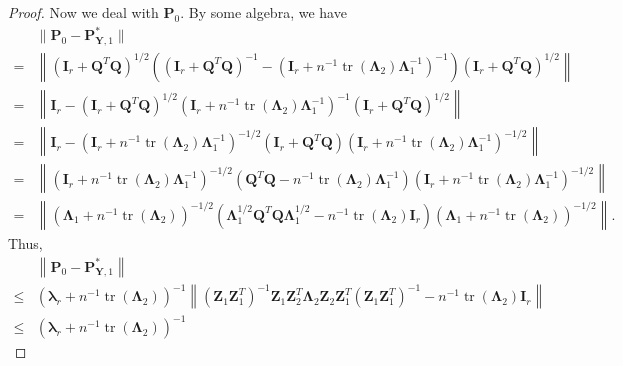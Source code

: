 \documentclass[12pt]{article} %
\DeclareMathOperator{\mytr}{tr}
\newcommand{\bQ}{\mathbf{Q}}
\newcommand{\bZ}{\mathbf{Z}}
\newcommand{\bP}{\mathbf{P}}
\newcommand{\bY}{\mathbf{Y}}
\newcommand{\bI}{\mathbf{I}}
\newcommand{\bfsym}[1]{\ensuremath{\boldsymbol{#1}}}
\def\blambda {\bfsym {\lambda}}
\def\bLambda {\bfsym {\Lambda}}
\theoremstyle{definition}
\begin{document}
\begin{appendices}
\begin{proof}
    Now we deal with $\bP_0$.
    By some algebra, we have
    \begin{equation*}
        \begin{split}
        &\Big\|\bP_0
        -
        \bP_{\bY,1}^*
        \Big\|
        \\
        = &
        \left\|
\left(\bI_r+ \bQ^T \bQ \right)^{1/2}
        \left(
    \left(\bI_r+ \bQ^T \bQ \right)^{-1}
-
    \left(\bI_r+ n^{-1}\mytr(\bLambda_2)\bLambda_1^{-1}\right)^{-1}
\right)
\left(\bI_r+ \bQ^T \bQ \right)^{1/2}
        \right\|
        \\
        = &
        \left\|
        \bI_r-
\left(\bI_r+ \bQ^T \bQ \right)^{1/2}
    \left(\bI_r+ n^{-1}\mytr(\bLambda_2)\bLambda_1^{-1}\right)^{-1}
\left(\bI_r+ \bQ^T \bQ \right)^{1/2}
        \right\|
        \\
        = &
        \left\|
        \bI_r-
    \left(\bI_r+ n^{-1}\mytr(\bLambda_2)\bLambda_1^{-1}\right)^{-1/2}
\left(\bI_r+ \bQ^T \bQ \right)
    \left(\bI_r+ n^{-1}\mytr(\bLambda_2)\bLambda_1^{-1}\right)^{-1/2}
        \right\|
        \\
        = &
        \left\|
    \left(\bI_r+ n^{-1}\mytr(\bLambda_2)\bLambda_1^{-1}\right)^{-1/2}
    \left(\bQ^T \bQ-n^{-1}\mytr(\bLambda_2) \bLambda_1^{-1} \right)
    \left(\bI_r+ n^{-1}\mytr(\bLambda_2)\bLambda_1^{-1}\right)^{-1/2}
        \right\|
        \\
        =&
        \left\|
        \left(\bLambda_1+n^{-1}\mytr(\bLambda_2)\right)^{-1/2}
        \left(
            \bLambda_1^{1/2}\bQ^T \bQ \bLambda_1^{1/2}
            - n^{-1} \mytr(\bLambda_2) \bI_r
        \right)
        \left(\bLambda_1+n^{-1}\mytr(\bLambda_2)\right)^{-1/2}
        \right\|
        .
        \end{split}
    \end{equation*}
    Thus,
    \begin{equation*}
        \begin{split}
        &
        \left\|
        \bP_0-\bP_{\bY,1}^*
        \right\|
        \\
        \leq &
        \left(\blambda_r+n^{-1}\mytr(\bLambda_2)\right)^{-1}
        \left\|
            (\bZ_1 \bZ_1^T)^{-1}
            \bZ_1 \bZ_2^T \bLambda_2 \bZ_2 \bZ_1^T 
            (\bZ_1 \bZ_1^T)^{-1}
            - n^{-1} \mytr(\bLambda_2) \bI_r
        \right\|
        \\
        \leq &
        \left(\blambda_r+n^{-1}\mytr(\bLambda_2)\right)^{-1}

\end{split}
\end{equation*}
\end{proof}
\end{appendices}
\end{document}

